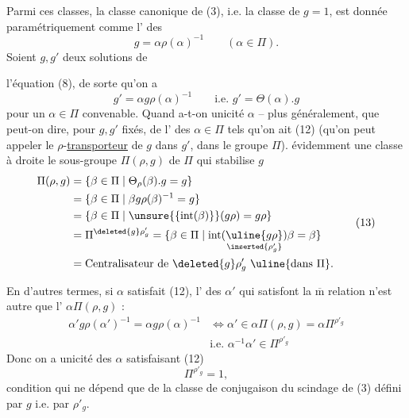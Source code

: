 Parmi ces classes, la classe   canonique de (3), i.e. la classe de $g=1$, est donnée paramétriquement  comme l' des
\[
g=\alpha\rho(\alpha)^{-1}\qquad(\alpha\in\Pi). \tag{11}
\]
Soient $g,g'$ deux solutions  de


l'équation (8), de sorte qu'on a
\[
g'=\alpha g\rho(\alpha)^{-1}\qquad\text{i.e. }g'=\Theta(\alpha).g \tag{12}
\]
pour un $\alpha\in\Pi$ convenable. Quand a-t-on unicité  $\alpha$ -- plus généralement, que peut-on dire, pour $g,g'$ fixés, de l' des $\alpha\in\Pi$  tels qu'on ait (12) (qu'on peut appeler le $\rho$-\uline{transporteur} de $g$ dans $g'$, dans le groupe $\Pi$).  évidemment une classe à droite  le sous-groupe $\Pi(\rho,g)$ de $\Pi$ qui  stabilise $g$
\[
\begin{aligned}
\Pi(\rho,g)&=\{\beta\in\Pi\mid\Theta_\rho(\beta).g=g\}\\
&=\{\beta\in\Pi\mid\beta g\rho(\beta)^{-1}=g\}\\
&=\{\beta\in\Pi\mid\unsure{\{\mathrm{int}(\beta)\}}(g\rho)=g\rho\}\\
&=\Pi^{\deleted{g}\rho'_g}=\{\beta\in\Pi\mid\mathrm{int}(\underset{\inserted{\rho'_g}}{\uline{g\rho}})\beta=\beta\}\\
&=\text{Centralisateur de }\deleted{g}\rho'_g\ \uline{\text{dans }\Pi}.
\end{aligned}\tag{13}
\]

En d'autres termes, si $\alpha$ satisfait (12), l' des $\alpha'$ qui satisfont la $\overline{\mathrm m}$ relation n'est autre que l' $\alpha\Pi(\rho,g)$ :
\[
\begin{aligned}
\alpha'g\rho(\alpha')^{-1}=\alpha g\rho(\alpha)^{-1}
&\Longleftrightarrow\alpha'\in\alpha\Pi(\rho,g)=\alpha\Pi^{\rho'_g}\\
&\text{i.e. }\alpha^{-1}\alpha'\in\Pi^{\rho'_g}
\end{aligned}\tag{14}
\]
Donc on a unicité des $\alpha$ satisfaisant (12)  
\[
\Pi^{\rho'_g}=1, \tag{15}
\]
condition qui ne dépend que de la classe de conjugaison du scindage  de (3) défini par $g$ i.e. par $\rho'_g$.


